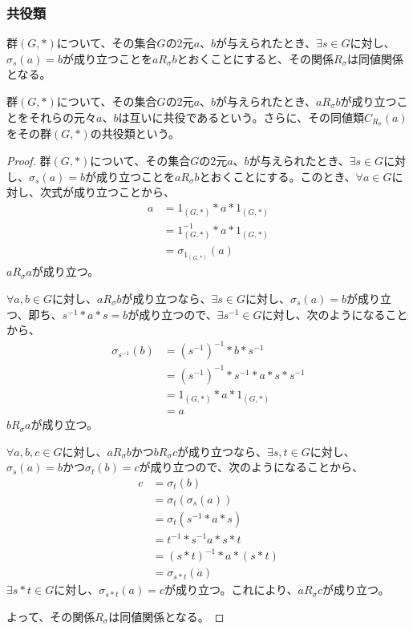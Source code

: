 \documentclass[dvipdfmx]{jsarticle}
\begin{document}
\subsubsection{共役類}%
\begin{thm}\label{3.1.3.5}
群$(G,*)$について、その集合$G$の2元$a$、$b$が与えられたとき、$\exists s \in G$に対し、$\sigma_{s}(a) = b$が成り立つことを$aR_{\sigma}b$とおくことにすると、その関係$R_{\sigma}$は同値関係となる。
\end{thm}
\begin{dfn}
群$(G,*)$について、その集合$G$の2元$a$、$b$が与えられたとき、$aR_{\sigma}b$が成り立つことをそれらの元々$a$、$b$は互いに共役であるという。さらに、その同値類$C_{R_{\sigma}}(a)$をその群$(G,*)$の共役類という。
\end{dfn}
\begin{proof}
群$(G,*)$について、その集合$G$の2元$a$、$b$が与えられたとき、$\exists s \in G$に対し、$\sigma_{s}(a) = b$が成り立つことを$aR_{\sigma}b$とおくことにする。このとき、$\forall a \in G$に対し、次式が成り立つことから、
\begin{align*}
a &= 1_{(G,*)}*a*1_{(G,*)}\\
&= 1_{(G,*)}^{- 1}*a*1_{(G,*)}\\
&= \sigma_{1_{(G,*)}}(a)
\end{align*}
$aR_{\sigma}a$が成り立つ。\par
$\forall a,b \in G$に対し、$aR_{\sigma}b$が成り立つなら、$\exists s \in G$に対し、$\sigma_{s}(a) = b$が成り立つ、即ち、$s^{- 1}*a*s = b$が成り立つので、$\exists s^{- 1} \in G$に対し、次のようになることから、
\begin{align*}
\sigma_{s^{- 1}}(b) &= \left( s^{- 1} \right)^{- 1}*b*s^{- 1}\\
&= \left( s^{- 1} \right)^{- 1}*s^{- 1}*a*s*s^{- 1}\\
&= 1_{(G,*)}*a*1_{(G,*)}\\
&= a
\end{align*}
$bR_{\sigma}a$が成り立つ。\par
$\forall a,b,c \in G$に対し、$aR_{\sigma}b$かつ$bR_{\sigma}c$が成り立つなら、$\exists s,t \in G$に対し、$\sigma_{s}(a) = b$かつ$\sigma_{t}(b) = c$が成り立つので、次のようになることから、
\begin{align*}
c &= \sigma_{t}(b)\\
&= \sigma_{t}\left( \sigma_{s}(a) \right)\\
&= \sigma_{t}\left( s^{- 1}*a*s \right)\\
&= t^{- 1}*s^{- 1}a*s*t\\
&= (s*t)^{- 1}*a*(s*t)\\
&= \sigma_{s*t}(a)
\end{align*}
$\exists s*t \in G$に対し、$\sigma_{s*t}(a) = c$が成り立つ。これにより、$aR_{\sigma}c$が成り立つ。\par
よって、その関係$R_{\sigma}$は同値関係となる。
\end{proof}
\end{document}
